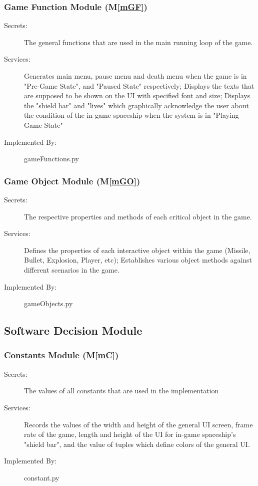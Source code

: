 \documentclass[12pt, titlepage]{article}
\newcommand{\mref}[1]{M\ref{#1}}
\begin{document}
\subsubsection{Game Function Module (\mref{mGF})}

\begin{description}
\item[Secrets:]The general functions that are used in the main running loop of the game.
\item[Services:]Generates main menu, pause menu and death menu when the game is in "Pre-Game State", and "Paused State" respectively; Displays the texts that are supposed to be shown on the UI with specified font and size; Displays the "shield bar" and "lives" which graphically acknowledge the user about the condition of the in-game spaceship when the system is in "Playing Game State"
\item[Implemented By:] gameFunctions.py
\end{description}

\subsubsection{Game Object Module (\mref{mGO})}

\begin{description}
\item[Secrets:]The respective properties and methods of each critical object in the game. 
\item[Services:]Defines the properties of each interactive object within the game (Missile, Bullet, Explosion, Player, etc); Establishes various object methods against different scenarios in the game.
\item[Implemented By:] gameObjects.py
\end{description}


\subsection{Software Decision Module}

\subsubsection{Constants Module (\mref{mC})}

\begin{description}
\item[Secrets:] The values of all constants that are used in the implementation
\item[Services:] Records the values of the width and height of the general UI screen, frame rate of the game, length and height of the UI for in-game spaceship's "shield bar", and the value of tuples which define colors of the general UI. 
\item[Implemented By:] constant.py
\end{description}
\end{document}
